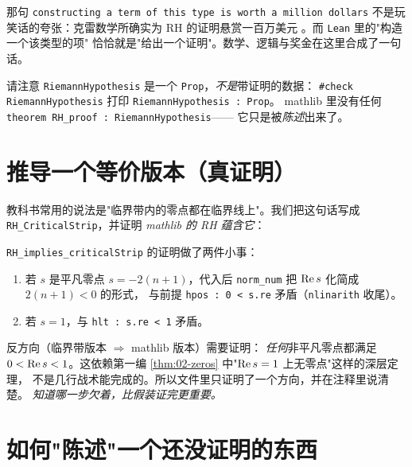 \begin{histbox}[库作者的幽默]
那句 \texttt{constructing a term of this type is worth a million dollars}
不是玩笑话的夸张：克雷数学所确实为 RH 的证明悬赏一百万美元
\cite{clay2000}。而 \texttt{Lean} 里的"构造一个该类型的项"
恰恰就是"给出一个证明"。数学、逻辑与奖金在这里合成了一句话。
\end{histbox}

请注意 \texttt{RiemannHypothesis} 是一个 \texttt{Prop}，\emph{不是}带证明的数据：
\texttt{\#check RiemannHypothesis} 打印 \texttt{RiemannHypothesis : Prop}。
mathlib 里没有任何 \texttt{theorem RH\_proof : RiemannHypothesis}——
它只是被\emph{陈述}出来了。

\section{推导一个等价版本（真证明）}
\label{sec:08-critical}

教科书常用的说法是"临界带内的零点都在临界线上"。我们把这句话写成
\texttt{RH\_CriticalStrip}，并证明 \emph{mathlib 的 RH 蕴含它}：


\texttt{RH\_implies\_criticalStrip} 的证明做了两件小事：

\begin{enumerate}[label=\arabic*.]
  \item 若 $s$ 是平凡零点 $s=-2(n+1)$，代入后
        \texttt{norm\_num} 把 $\operatorname{Re} s$ 化简成 $2(n+1)<0$ 的形式，
        与前提 \texttt{hpos : 0 < s.re} 矛盾（\texttt{nlinarith} 收尾）。
  \item 若 $s=1$，与 \texttt{hlt : s.re < 1} 矛盾。
\end{enumerate}

\begin{warnbox}[为什么反过来难]
反方向（临界带版本 $\Rightarrow$ mathlib 版本）需要证明：
\emph{任何}非平凡零点都满足 $0<\operatorname{Re} s<1$。这依赖第一编
\cref{thm:02-zeros} 中"$\operatorname{Re} s=1$ 上无零点"这样的深层定理，
不是几行战术能完成的。所以文件里只证明了一个方向，并在注释里说清楚。
\emph{知道哪一步欠着，比假装证完更重要。}
\end{warnbox}

\section{如何"陈述"一个还没证明的东西}
\label{sec:08-honest}

